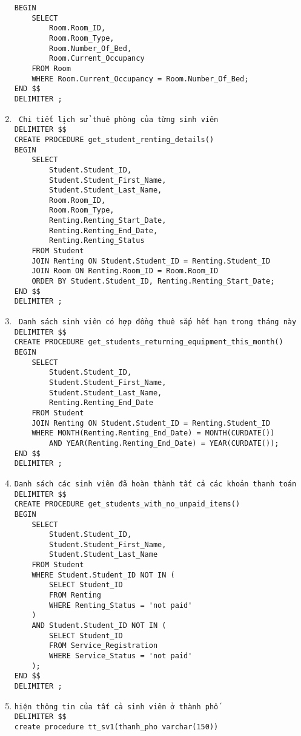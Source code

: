 \documentclass[a4paper,12pt]{article}
\begin{document}
\begin{enumerate}
\begin{verbatim}
BEGIN
    SELECT 
        Room.Room_ID,
        Room.Room_Type,
        Room.Number_Of_Bed,
        Room.Current_Occupancy
    FROM Room
    WHERE Room.Current_Occupancy = Room.Number_Of_Bed;
END $$
DELIMITER ;
\end{verbatim}
\item \begin{verbatim}
 Chi tiết lịch sử thuê phòng của từng sinh viên
DELIMITER $$
CREATE PROCEDURE get_student_renting_details()
BEGIN
    SELECT 
        Student.Student_ID,
        Student.Student_First_Name,
        Student.Student_Last_Name,
        Room.Room_ID,
        Room.Room_Type,
        Renting.Renting_Start_Date,
        Renting.Renting_End_Date,
        Renting.Renting_Status
    FROM Student
    JOIN Renting ON Student.Student_ID = Renting.Student_ID
    JOIN Room ON Renting.Room_ID = Room.Room_ID
    ORDER BY Student.Student_ID, Renting.Renting_Start_Date;
END $$
DELIMITER ;
\end{verbatim}
\item \begin{verbatim}
 Danh sách sinh viên có hợp đồng thuê sắp hết hạn trong tháng này
DELIMITER $$
CREATE PROCEDURE get_students_returning_equipment_this_month()
BEGIN
    SELECT 
        Student.Student_ID, 
        Student.Student_First_Name, 
        Student.Student_Last_Name,
        Renting.Renting_End_Date
    FROM Student
    JOIN Renting ON Student.Student_ID = Renting.Student_ID
    WHERE MONTH(Renting.Renting_End_Date) = MONTH(CURDATE()) 
        AND YEAR(Renting.Renting_End_Date) = YEAR(CURDATE());
END $$
DELIMITER ;
\end{verbatim}
\item \begin{verbatim}
Danh sách các sinh viên đã hoàn thành tất cả các khoản thanh toán
DELIMITER $$
CREATE PROCEDURE get_students_with_no_unpaid_items()
BEGIN
    SELECT 
        Student.Student_ID, 
        Student.Student_First_Name, 
        Student.Student_Last_Name
    FROM Student
    WHERE Student.Student_ID NOT IN (
        SELECT Student_ID
        FROM Renting
        WHERE Renting_Status = 'not paid'
    )
    AND Student.Student_ID NOT IN (
        SELECT Student_ID
        FROM Service_Registration
        WHERE Service_Status = 'not paid'
    );
END $$
DELIMITER ;
\end{verbatim}
\item \begin{verbatim}
hiện thông tin của tất cả sinh viên ở thành phố
DELIMITER $$
create procedure tt_sv1(thanh_pho varchar(150))

\end{verbatim}
\end{enumerate}
\end{document}

